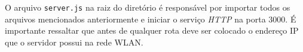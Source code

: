 \par 
O arquivo \texttt{server.js} na raiz do diretório é responsável por importar todos os arquivos mencionados anteriormente e iniciar o serviço \textit{HTTP} na porta $3000$. É importante ressaltar que antes de qualquer rota deve ser colocado o endereço IP que o servidor possui na rede WLAN.

